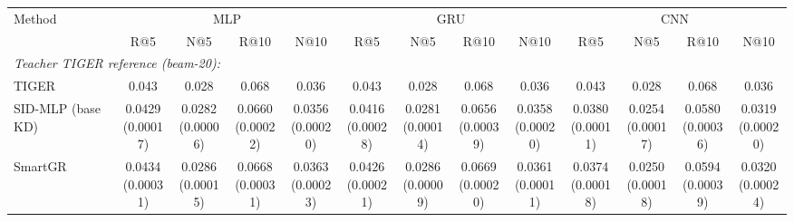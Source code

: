 \begin{table}[t]
\centering
\fontsize{6.6}{7.8}\selectfont
\setlength{\tabcolsep}{1.1mm}
\renewcommand{\arraystretch}{1.05}
\begin{tabular}{lcccccccccccc}
\toprule
Method & \multicolumn{4}{c}{MLP} & \multicolumn{4}{c}{GRU} & \multicolumn{4}{c}{CNN} \\
 & R@5 & N@5 & R@10 & N@10 & R@5 & N@5 & R@10 & N@10 & R@5 & N@5 & R@10 & N@10 \\
\cmidrule(lr){2-5}\cmidrule(lr){6-9}\cmidrule(lr){10-13}
\midrule
\multicolumn{13}{l}{\emph{Teacher TIGER reference (beam-20):}} \\
TIGER & 0.043 & 0.028 & 0.068 & 0.036 & 0.043 & 0.028 & 0.068 & 0.036 & 0.043 & 0.028 & 0.068 & 0.036 \\
\midrule
SID-MLP (base KD) & \shortstack[c]{0.0429\\[-1pt]{\tiny(0.00017)}} & \shortstack[c]{0.0282\\[-1pt]{\tiny(0.00006)}} & \shortstack[c]{0.0660\\[-1pt]{\tiny(0.00022)}} & \shortstack[c]{0.0356\\[-1pt]{\tiny(0.00020)}} & \shortstack[c]{0.0416\\[-1pt]{\tiny(0.00028)}} & \shortstack[c]{0.0281\\[-1pt]{\tiny(0.00014)}} & \shortstack[c]{0.0656\\[-1pt]{\tiny(0.00039)}} & \shortstack[c]{0.0358\\[-1pt]{\tiny(0.00020)}} & \shortstack[c]{0.0380\\[-1pt]{\tiny(0.00011)}} & \shortstack[c]{0.0254\\[-1pt]{\tiny(0.00017)}} & \shortstack[c]{0.0580\\[-1pt]{\tiny(0.00036)}} & \shortstack[c]{0.0319\\[-1pt]{\tiny(0.00020)}} \\
SmartGR & \shortstack[c]{0.0434\\[-1pt]{\tiny(0.00031)}} & \shortstack[c]{0.0286\\[-1pt]{\tiny(0.00015)}} & \shortstack[c]{0.0668\\[-1pt]{\tiny(0.00031)}} & \shortstack[c]{0.0363\\[-1pt]{\tiny(0.00023)}} & \shortstack[c]{0.0426\\[-1pt]{\tiny(0.00021)}} & \shortstack[c]{0.0286\\[-1pt]{\tiny(0.00009)}} & \shortstack[c]{0.0669\\[-1pt]{\tiny(0.00020)}} & \shortstack[c]{0.0361\\[-1pt]{\tiny(0.00011)}} & \shortstack[c]{0.0374\\[-1pt]{\tiny(0.00018)}} & \shortstack[c]{0.0250\\[-1pt]{\tiny(0.00018)}} & \shortstack[c]{0.0594\\[-1pt]{\tiny(0.00039)}} & \shortstack[c]{0.0320\\[-1pt]{\tiny(0.00024)}} \\

\end{tabular}
\end{table}
